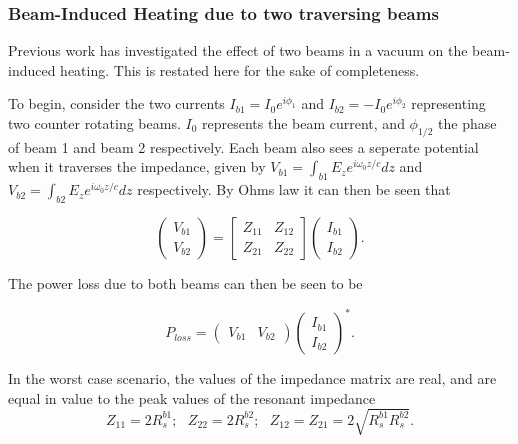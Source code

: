 \subsubsection{Beam-Induced Heating due to two traversing beams}

Previous work \cite{Grudiev:twoBeamCol} has investigated the effect of two beams in a vacuum on the beam-induced heating. This is restated here for the sake of completeness.

To begin, consider the two currents $I_{b1} = I_{0}e^{i\phi_{1}}$ and $I_{b2} = -I_{0}e^{i\phi_{2}}$ representing two counter rotating beams. $I_{0}$ represents the beam current, and $\phi_{1/2}$ the phase of beam 1 and beam 2 respectively. Each beam also sees a seperate potential when it traverses the impedance, given by $V_{b1} = \int_{b1} E_{z} e^{i\omega_{0}z/c} dz$ and $V_{b2} = \int_{b2} E_{z} e^{i\omega_{0}z/c} dz$ respectively. By Ohms law it can then be seen that

\begin{equation}
\begin{pmatrix}
V_{b1} \\
V_{b2}
\end{pmatrix}
=
\begin{bmatrix}
Z_{11} & Z_{12} \\
Z_{21} & Z_{22}
\end{bmatrix}
\begin{pmatrix}
I_{b1} \\
I_{b2}
\end{pmatrix}.
\end{equation}

The power loss due to both beams can then be seen to be

\begin{equation}
P_{loss} = \begin{pmatrix}
V_{b1} & V_{b2}
\end{pmatrix}
\begin{pmatrix}
I_{b1} \\
I_{b2}
\end{pmatrix}^{*}.
\end{equation}

In the worst case scenario, the values of the impedance matrix are real, and are equal in value to the peak values of the resonant impedance
\begin{equation}
Z_{11} = 2R^{b1}_{s};\text{    } Z_{22} = 2R^{b2}_{s};\text{    }  Z_{12} = Z_{21} = 2 \sqrt{R^{b1}_{s}R^{b2}_{s}}.
\end{equation}


